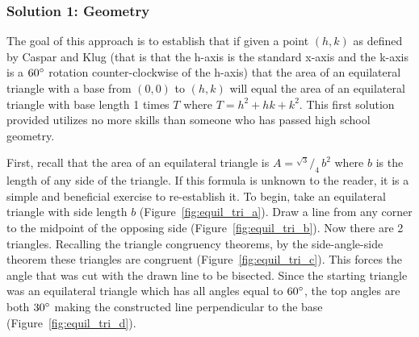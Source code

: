 \documentclass[12pt,letter]{article}
\newcommand*\rfrac[2]{{}^{#1}\!/_{#2}}
\begin{document}
\subsubsection{Solution 1: Geometry} %
The goal of this approach is to establish that if given a point $(h,k)$ as defined by Caspar and Klug (that is that the h-axis is the standard x-axis and the k-axis is a $60\degree$ rotation counter-clockwise of the h-axis) that the area of an equilateral triangle with a base from $(0,0)$ to $(h,k)$ will equal the area of an equilateral triangle with base length 1 times $T$ where $T = h^2 + hk + k^2$. This first solution provided utilizes no more skills than someone who has passed high school geometry.

First, recall that the area of an equilateral triangle is $A = \rfrac {\sqrt{3}} {4} \, b^2$ where $b$ is the length of any side of the triangle. If this formula is unknown to the reader, it is a simple and beneficial exercise to re-establish it. To begin, take an equilateral triangle with side length $b$ (Figure~\ref{fig:equil_tri_a}). Draw a line from any corner to the midpoint of the opposing side (Figure~\ref{fig:equil_tri_b}). Now there are 2 triangles. Recalling the triangle congruency theorems, by the side-angle-side theorem these triangles are congruent (Figure~\ref{fig:equil_tri_c}). This forces the angle that was cut with the drawn line to be bisected. Since the starting triangle was an equilateral triangle which has all angles equal to $60\degree$, the top angles are both $30\degree$ making the constructed line perpendicular to the base (Figure~\ref{fig:equil_tri_d}).
\end{document}

